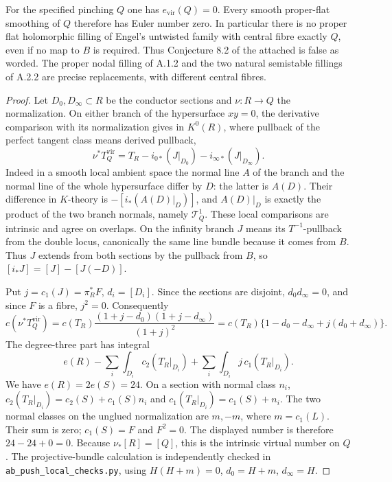 \begin{theorem}\label{push:A32}
For the specified pinching $Q$ one has $e_{\mathrm{vir}}(Q)=0$.
Every smooth proper-flat smoothing of $Q$ therefore has Euler
number zero. In particular there is no proper flat holomorphic
filling of Engel's untwisted family with central fibre exactly
$Q$, even if no map to $B$ is required. Thus Conjecture 8.2
of the attached \cite{E26} is false as worded. The proper nodal
filling of A.1.2 and the two natural semistable fillings of
A.2.2 are precise replacements, with different central fibres.
\end{theorem}
\begin{proof}
Let $D_0,D_\infty\subset R$ be the conductor sections and
$\nu:R\to Q$ the normalization. On either branch of the
hypersurface $xy=0$, the derivative comparison with its
normalization gives in $K^0(R)$, where pullback of the
perfect tangent class means derived pullback,
\[
 \nu^*T_Q^{\mathrm{vir}}
 =T_R-i_{0*}(J|_{D_0})-i_{\infty*}(J|_{D_\infty}).
\]
Indeed in a smooth local ambient space the normal line $A$ of
the branch and the normal line of the whole hypersurface
differ by $D$: the latter is $A(D)$. Their difference in
$K$-theory is $-[i_*(A(D)|_D)]$, and $A(D)|_D$ is exactly
the product of the two branch normals, namely $\mathcal T^1_Q$.
These local comparisons are intrinsic and agree on overlaps.
On the infinity branch $J$ means its $T^{-1}$-pullback
from the double locus, canonically the same line bundle
because it comes from $B$. Thus $J$ extends from both sections by the pullback from $B$,
so $[i_*J]=[J]-[J(-D)]$.

Put $j=c_1(J)=\pi_R^*F$, $d_i=[D_i]$. Since the sections are
disjoint, $d_0d_\infty=0$, and since $F$ is a fibre, $j^2=0$.
Consequently
\[
 c(\nu^*T_Q^{\mathrm{vir}})
 =c(T_R)\frac{(1+j-d_0)(1+j-d_\infty)}{(1+j)^2}
 =c(T_R)\{1-d_0-d_\infty+j(d_0+d_\infty)\}.
\]
The degree-three part has integral
\[
 e(R)-\sum_i\int_{D_i}c_2(T_R|_{D_i})
       +\sum_i\int_{D_i}j\,c_1(T_R|_{D_i}).
\]
We have $e(R)=2e(S)=24$. On a section with normal class
$n_i$, $c_2(T_R|_{D_i})=c_2(S)+c_1(S)n_i$ and
$c_1(T_R|_{D_i})=c_1(S)+n_i$. The two normal classes on
the unglued normalization are $m,-m$, where $m=c_1(L)$.
Their sum is zero; $c_1(S)=F$ and $F^2=0$. The displayed
number is therefore $24-24+0=0$. Because
$\nu_*[R]=[Q]$, this is the intrinsic virtual number on $Q$.
The projective-bundle calculation is independently checked
in \texttt{ab\_push\_local\_checks.py}, using
$H(H+m)=0$, $d_0=H+m$, $d_\infty=H$.


\end{proof}
